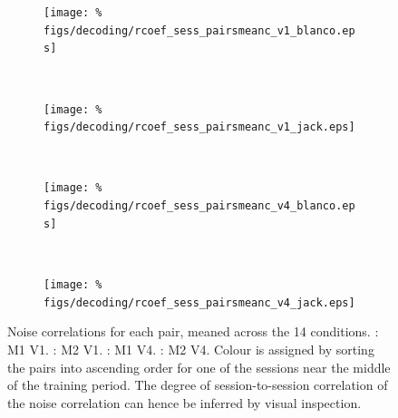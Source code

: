 \begin{figure}[htbp]
    \begin{subfigure}[b]{0.5\linewidth}
        \centering
        \caption{}
        \label{fig:noise_r_b1_pmc}
        \texttt{[image: \%
figs/decoding/rcoef\_sess\_pairsmeanc\_v1\_blanco.eps]}
    \end{subfigure}
    ~~
    \begin{subfigure}[b]{0.5\linewidth}
        \centering
        \caption{}
        \label{fig:noise_r_j1_pmc}
        \texttt{[image: \%
figs/decoding/rcoef\_sess\_pairsmeanc\_v1\_jack.eps]}
    \end{subfigure}
    \\
    \begin{subfigure}[b]{0.5\linewidth}
        \centering
        \caption{}
        \label{fig:noise_r_b4_pmc}
        \texttt{[image: \%
figs/decoding/rcoef\_sess\_pairsmeanc\_v4\_blanco.eps]}
    \end{subfigure}
    ~~
    \begin{subfigure}[b]{0.5\linewidth}
        \centering
        \caption{}
        \label{fig:noise_r_j4_pmc}
        \texttt{[image: \%
figs/decoding/rcoef\_sess\_pairsmeanc\_v4\_jack.eps]}
    \end{subfigure}
    \caption{Noise correlations for each pair, meaned across the 14 conditions.
\protect{}: \ac{M1} \ac{V1}.
\protect{}: \ac{M2} \ac{V1}.
\protect{}: \ac{M1} \ac{V4}.
\protect{}: \ac{M2} \ac{V4}.
Colour is assigned by sorting the pairs into ascending order for one of the sessions near the middle of the training period.
The degree of session-to-session correlation of the noise correlation can hence be inferred by visual inspection.
}
    \label{fig:noise_r_pmc}
\end{figure}


